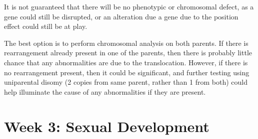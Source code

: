 \documentclass[plain,basic]{inVerba-notes}
\begin{document}
\begin{enumerate}
    It is not guaranteed that there will be no phenotypic or chromosomal defect, as a gene could still be disrupted, or an alteration due a gene due to the position effect could still be at play. 

    The best option is to perform chromosomal analysis on both parents. If there is rearrangement already present in one of the parents, then there is probably little chance that any abnormalities are due to the translocation. However, if there is no rearrangement present, then it could be significant, and further testing using uniparental disomy (2 copies from same parent, rather than 1 from both) could help illuminate the cause of any abnormalities if they are present.
  \end{enumerate}

  \section{Week 3: Sexual Development}
\end{document}
